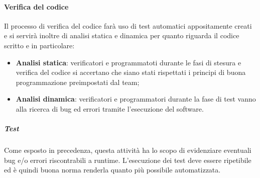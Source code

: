 \paragraph{Verifica del codice}
Il processo di verifica del codice farà uso di test automatici appositamente creati e si servirà inoltre di analisi statica e dinamica per quanto riguarda il codice scritto e in particolare:
\begin{itemize}
    \item \textbf{Analisi statica}: verificatori e programmatoti durante le fasi di stesura e verifica del codice si accertano che siano stati rispettati i principi di buona programmazione preimpostati dal team;
    \item \textbf{Analisi dinamica}: verificatori e programmatori durante la fase di test vanno alla ricerca di bug\glo{} ed errori tramite l'esecuzione del software.
\end{itemize}

\subparagraph{Test}
Come esposto in precedenza, questa attività ha lo scopo di evidenziare eventuali bug\glo{} e/o errori riscontrabili a runtime. L'esecuzione dei test deve essere ripetibile ed è quindi buona norma renderla quanto più possibile automatizzata.

